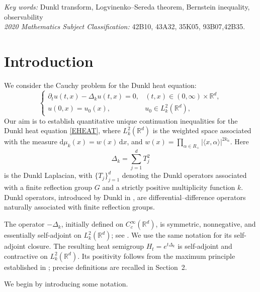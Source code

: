 \documentclass[12pt]{article}
\begin{document}
\noindent\textit{Key words:} Dunkl transform,  Logvinenko--Sereda theorem, Bernstein inequality, observability \\
\noindent\textit{2020 Mathematics Subject Classification:} 42B10, 43A32, 35K05,  93B07,42B35.

\section{Introduction}
We consider the Cauchy problem for the Dunkl heat equation:
\begin{equation}\label{EHEAT}
	\begin{cases}
		\partial_tu(t,x)-\Delta_ku(t,x)=0,
		& (t,x)\in(0,\infty)\times\mathbb{R}^d,\\
		u(0,x)=u_0(x),
		& u_0\in L_k^2(\mathbb{R}^d),
	\end{cases}
\end{equation}
Our aim is to establish quantitative unique continuation inequalities for the Dunkl heat equation \eqref{EHEAT}, where $L_k^2(\mathbb{R}^d)$ is the weighted space associated with the measure
$ \mathrm{d}\mu_k(x)=w(x)\,\mathrm{d}x $, and $w(x)=\prod_{\alpha\in R_+}|\langle x,\alpha\rangle|^{2k_\alpha}$. Here
\[
\Delta_k=\sum_{j=1}^d T_j^2
\]
is the Dunkl Laplacian, with $\{ T_j\}_{j=1}^d$ denoting the Dunkl operators associated with a finite reflection group $G$ and a strictly positive multiplicity function $k$. Dunkl operators, introduced by Dunkl in \cite{CFD1}, are differential--difference operators naturally associated with finite reflection groups.

The operator $-\Delta_k$, initially defined on $C_c^\infty(\mathbb{R}^d)$, is symmetric, nonnegative, and essentially self-adjoint on $L_k^2(\mathbb{R}^d)$; see \cite{AB}. We use the same notation for its self-adjoint closure. The resulting heat semigroup $H_t=e^{t\Delta_k}$ is self-adjoint and contractive on $L_k^2(\mathbb{R}^d)$. Its positivity follows from the maximum principle established in \cite{MR2}; precise definitions are recalled in Section~2.

We begin by introducing some notation.
\end{document}
